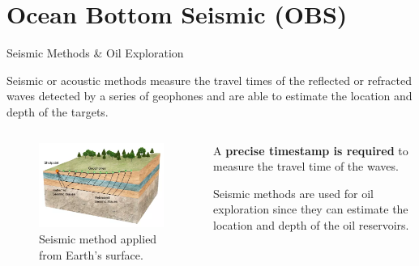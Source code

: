 \section{Ocean Bottom Seismic (OBS)}

\begin{frame}{Seismic Methods \& Oil Exploration}

    Seismic or acoustic methods measure the travel times of the reflected or refracted waves detected by a series of geophones and are able to estimate the location and depth of the targets.

    \vspace{10pt}

    \begin{columns}[c, onlytextwidth]

        \begin{column}{0.45\textwidth}

            \begin{figure}
                \centering
                \includegraphics[width=\textwidth]{img/OBS-seimic.png}
                \caption{Seismic method applied from Earth's surface.}
            \end{figure}

        \end{column}

        \hfill

        \begin{column}{0.5\textwidth}

            A \textbf{precise timestamp is required} to measure the travel time of the waves.

            \vspace{10pt}

            Seismic methods are used for oil exploration since they can estimate the location and depth of the oil reservoirs.

        \end{column}

    \end{columns}

\end{frame}



